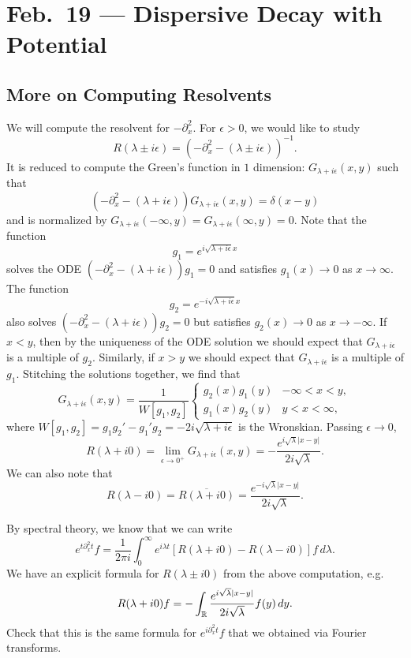 \chapter{Feb.~19 --- Dispersive Decay with Potential}

\section{More on Computing Resolvents}

\begin{example}
  We will compute the resolvent for $-\partial_x^2$.
  For $\epsilon > 0$, we would like to study
  \[
    R(\lambda \pm i \epsilon) = (-\partial_x^2 - (\lambda \pm i \epsilon))^{-1}.
  \]
  It is reduced to compute the Green's function in
  $1$ dimension: $G_{\lambda + i\epsilon}(x, y)$ such
  that
  \[
    (-\partial_x^2 - (\lambda + i\epsilon)) G_{\lambda + i\epsilon}(x, y) = \delta(x - y)
  \]
  and is normalized by
  $G_{\lambda + i\epsilon}(-\infty, y) = G_{\lambda + i\epsilon}(\infty, y) = 0$. Note that
  the function
  \[
    g_1 = e^{i\sqrt{\lambda + i\epsilon} x}
  \]
  solves the ODE $(-\partial_x^2 - (\lambda + i\epsilon)) g_1 = 0$
  and satisfies $g_1(x) \to 0$ as $x \to \infty$.
  The function
  \[
    g_2 = e^{-i\sqrt{\lambda + i\epsilon} x}
  \]
  also solves $(-\partial_x^2 - (\lambda + i\epsilon)) g_2 = 0$
  but satisfies $g_2(x) \to 0$ as $x \to -\infty$.
  If $x < y$, then by the uniqueness of the ODE solution
  we should expect that $G_{\lambda + i\epsilon}$ is a multiple of $g_2$.
  Similarly, if $x > y$ we should expect that
  $G_{\lambda + i\epsilon}$ is a multiple of $g_1$.
  Stitching the solutions together, we find that
  \[
    G_{\lambda + i\epsilon}(x, y)
    = \frac{1}{W[g_1, g_2]}
    \begin{cases}
      g_2(x) g_1(y) & -\infty < x < y, \\
      g_1(x) g_2(y) & y < x < \infty,
    \end{cases}
  \]
  where $W[g_1, g_2] = g_1 g_2' - g_1' g_2 = -2i \sqrt{\lambda + i\epsilon}$ is the Wronskian.
  Passing $\epsilon \to 0$,
  \[
    R(\lambda + i 0) = \lim_{\epsilon \to 0^+} G_{\lambda + i\epsilon}(x, y)
    = -\frac{e^{i \sqrt{\lambda}|x - y|}}{2i \sqrt{\lambda}}.
  \]
  We can also note that
  \[
    R(\lambda - i 0) = \overline{R(\lambda + i 0)}
    = \frac{e^{-i \sqrt{\lambda}|x - y|}}{2i \sqrt{\lambda}}.
  \]
\end{example}

\begin{exercise}
  By spectral theory, we know that we can write
  \[
    e^{t \partial_x^2 t} f = \frac{1}{2\pi i} \int_0^\infty e^{i\lambda t} [R(\lambda + i0) - R(\lambda - i0)] f\, d\lambda.
  \]
  We have an explicit formula for
  $R(\lambda \pm i 0)$ from the above computation, e.g.
  \[
    R(\lambda + i 0) f = -\int_{\mathbb{R}} \frac{e^{i \sqrt{\lambda}|x - y|}}{2i \sqrt{\lambda}} f(y)\, dy.
  \]
  Check that this is the same formula for
  $e^{i\partial_x^2 t} f$ that
  we obtained via Fourier transforms.
\end{exercise}

